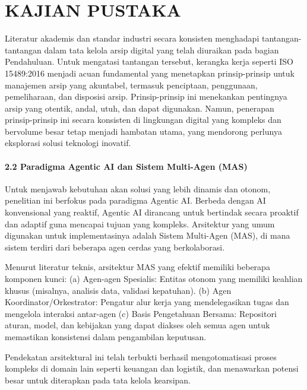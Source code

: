 \hypertarget{kajian-pustaka}{%
\section{KAJIAN PUSTAKA}\label{kajian-pustaka}}

Literatur akademis dan standar industri secara konsisten menghadapi
tantangan-tantangan dalam tata kelola arsip digital yang telah diuraikan
pada bagian Pendahuluan. Untuk mengatasi tantangan tersebut, kerangka
kerja seperti ISO 15489:2016 menjadi acuan fundamental yang menetapkan
prinsip-prinsip untuk manajemen arsip yang akuntabel, termasuk
penciptaan, penggunaan, pemeliharaan, dan disposisi arsip.
Prinsip-prinsip ini menekankan pentingnya arsip yang otentik, andal,
utuh, dan dapat digunakan. Namun, penerapan prinsip-prinsip ini secara
konsisten di lingkungan digital yang kompleks dan bervolume besar tetap
menjadi hambatan utama, yang mendorong perlunya eksplorasi solusi
teknologi inovatif.

\hypertarget{paradigma-agentic-ai-dan-sistem-multi-agen-mas}{%
\paragraph{2.2 Paradigma Agentic AI dan Sistem Multi-Agen
(MAS)}\label{paradigma-agentic-ai-dan-sistem-multi-agen-mas}}

Untuk menjawab kebutuhan akan solusi yang lebih dinamis dan otonom,
penelitian ini berfokus pada paradigma Agentic AI. Berbeda dengan AI
konvensional yang reaktif, Agentic AI dirancang untuk bertindak secara
proaktif dan adaptif guna mencapai tujuan yang kompleks. Arsitektur yang
umum digunakan untuk implementasinya adalah Sistem Multi-Agen (MAS), di
mana sistem terdiri dari beberapa agen cerdas yang berkolaborasi.

Menurut literatur teknis, arsitektur MAS yang efektif memiliki beberapa
komponen kunci: (a) Agen-agen Spesialis: Entitas otonom yang memiliki
keahlian khusus (misalnya, analisis data, validasi kepatuhan). (b) Agen
Koordinator/Orkestrator: Pengatur alur kerja yang mendelegasikan tugas
dan mengelola interaksi antar-agen (c) Basis Pengetahuan Bersama:
Repositori aturan, model, dan kebijakan yang dapat diakses oleh semua
agen untuk memastikan konsistensi dalam pengambilan keputusan.

Pendekatan arsitektural ini telah terbukti berhasil mengotomatisasi
proses kompleks di domain lain seperti keuangan dan logistik, dan
menawarkan potensi besar untuk diterapkan pada tata kelola kearsipan.

